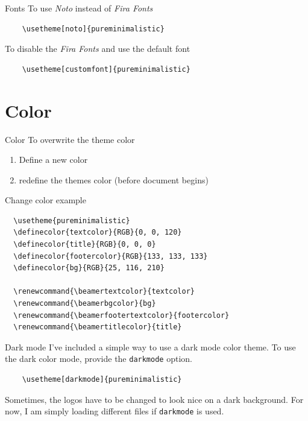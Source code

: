 \documentclass[aspectratio=169]{beamer}
\begin{document}
\begin{frame}[fragile]{Fonts}
	To use \emph{Noto} instead of \emph{Fira Fonts}
	\begin{verbatim}
    \usetheme[noto]{pureminimalistic}
  \end{verbatim}
	\vfill
	To disable the \emph{Fira Fonts} and use the default font
	\begin{verbatim}
    \usetheme[customfont]{pureminimalistic}
  \end{verbatim}
\end{frame}

\section{Color}
\begin{frame}[fragile]{Color}
	To overwrite the theme color
	\begin{enumerate}
		\item Define a new color
		\item redefine the themes color (before document begins)
	\end{enumerate}
\end{frame}

\begin{frame}[fragile]{Change color example}
	\small
	\begin{verbatim}
  \usetheme{pureminimalistic}
  \definecolor{textcolor}{RGB}{0, 0, 120}
  \definecolor{title}{RGB}{0, 0, 0}
  \definecolor{footercolor}{RGB}{133, 133, 133}
  \definecolor{bg}{RGB}{25, 116, 210}

  \renewcommand{\beamertextcolor}{textcolor}
  \renewcommand{\beamerbgcolor}{bg}
  \renewcommand{\beamerfootertextcolor}{footercolor}
  \renewcommand{\beamertitlecolor}{title}
  \end{verbatim}
\end{frame}

\begin{frame}[fragile]{Dark mode}
	I've included a simple way to use a dark mode
	color theme. To use the dark color mode, provide the \texttt{darkmode}
	option.
	\begin{verbatim}
    \usetheme[darkmode]{pureminimalistic}
    \end{verbatim}
	Sometimes, the logos have to be changed to look nice on a
	dark background. For now, I am simply loading different
	files if \texttt{darkmode} is used.
\end{frame}
\end{document}
